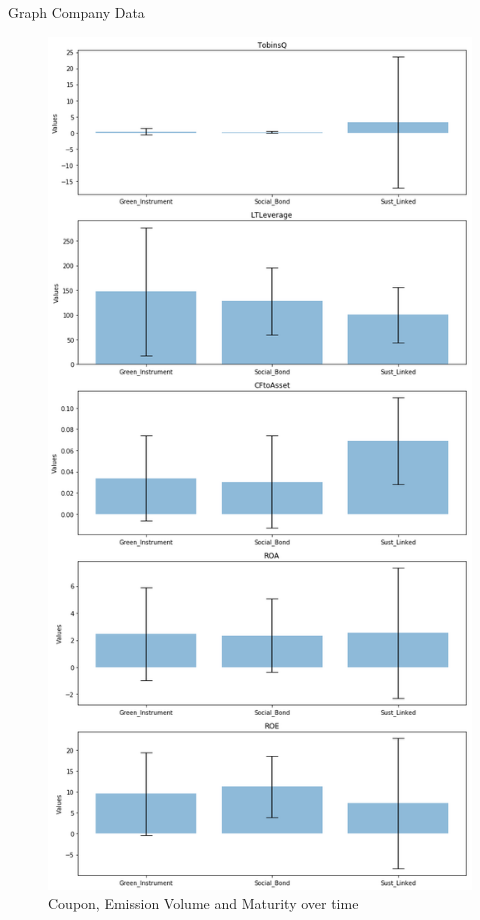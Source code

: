 \documentclass[
	8pt, %
]{beamer}
\begin{document}
\begin{frame}{Graph Company Data}
    \begin{figure}[H]
    \centering
    \includegraphics[width=0.8\linewidth, height=0.8\textheight, keepaspectratio]{Company_Data.png}
    \caption{Coupon, Emission Volume and Maturity over time}
\label{fig:Metrics}
\end{figure}
\end{frame}
\end{document}
